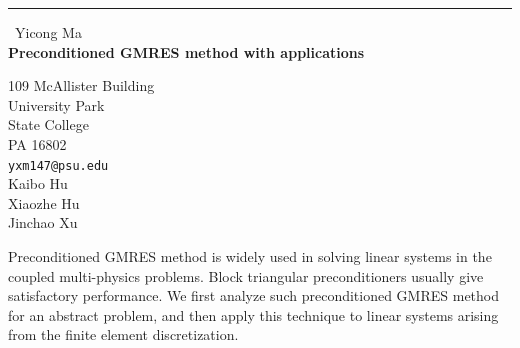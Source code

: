 \documentclass{report}
\begin{document}
\begin{center}
\rule{6in}{1pt} \
{\large Yicong Ma \\
{\bf Preconditioned GMRES method with applications}}

109 McAllister Building \\ University Park \\ State College \\ PA 16802
\\
{\tt yxm147@psu.edu}\\
Kaibo Hu\\
Xiaozhe Hu\\
Jinchao Xu\end{center}

Preconditioned GMRES method is widely used in solving linear systems in the
coupled multi-physics problems. Block triangular preconditioners usually give
satisfactory performance. We first analyze such preconditioned GMRES method
for an abstract problem, and then apply this technique to linear systems
arising from the finite element discretization.
\end{document}
